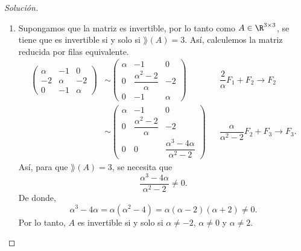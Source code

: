\documentclass[a4,11pt]{aleph-notas}
\begin{document}
\begin{proof}[Solución]\hspace{0pt}
    \begin{enumerate}
        \item Supongamos que la matriz es invertible, por lo tanto como $A\in\R^{3\times 3}$, se tiene que es invertible si y solo si $\rang(A)=3$. Así, calculemos la matriz reducida por filas equivalente.
        \begin{align*}
            \begin{pmatrix}
                \alpha & -1 & 0 \\
                -2 & \alpha & -2 \\
                0 & -1 & \alpha
            \end{pmatrix}
         & \sim \begin{pmatrix}
                \alpha & -1 & 0 \\
                0 & \dfrac{\alpha^2-2}{\alpha} & -2 \\
                0 & -1 & \alpha 
            \end{pmatrix} && \dfrac{2}{\alpha} F_1 + F_2 \rightarrow F_2 \\
        &\sim \begin{pmatrix}
                \alpha & -1 & 0 \\
                0 & \dfrac{\alpha^2-2}{\alpha} & -2 \\
                0 & 0 & \dfrac{\alpha^3-4\alpha}{\alpha^2-2}
            \end{pmatrix} && \dfrac{\alpha}{\alpha^2-2} F_2 + F_3 \rightarrow F_3.
        \end{align*}
        Así, para que $\rang(A)=3$, se necesita que 
        \[
            \dfrac{\alpha^3-4\alpha}{\alpha^2-2} \neq 0.
        \]
        De donde, 
        \[
            \alpha^3-4\alpha = \alpha ( \alpha^2-4) = \alpha (\alpha-2)(\alpha+2)\neq 0.
        \]
        Por lo tanto, $A$ es invertible si y solo si $\alpha \neq-2$, $\alpha\neq0$ y $\alpha\neq2$.
    

\end{enumerate}
\end{proof}
\end{document}
